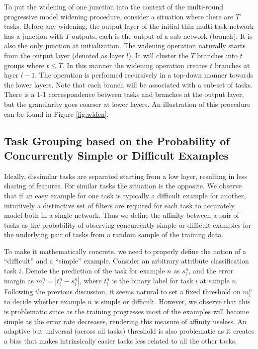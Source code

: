 \documentclass[10pt,twocolumn,letterpaper]{article}
\begin{document}
To put the widening of one junction into the context of the multi-round progressive model widening procedure, consider a situation where there are $T$ tasks. Before any widening, the output layer of the initial thin multi-task network has a junction with $T$ outputs, each is the output of a sub-network (branch). It is also the only junction at initialization. The widening operation naturally starts from the output layer (denoted as layer $l$). It will cluster the $T$ branches into $t$ groups where $t \leq T$. In this manner the widening operation creates $t$ branches at layer $l-1$. The operation is performed recursively in a top-down manner towards the lower layers. Note that each branch will be associated with a sub-set of tasks. There is a 1-1 correspondence between tasks and branches at the output layer, but the granularity goes coarser at lower layers. An illustration of this procedure can be found in Figure \ref{fig:widen}. 

\subsection{Task Grouping based on the Probability of Concurrently Simple or Difficult Examples}
\label{sec:aff}

Ideally, dissimilar tasks are separated starting from a low layer, resulting in less sharing of features. For similar tasks the situation is the opposite. We observe that if an easy example for one task is typically a difficult example for another, intuitively a distinctive set of filters are required for each task to accurately model both in a single network. Thus we define the affinity between a pair of tasks as the probability of observing concurrently simple or difficult examples for the underlying pair of tasks from a random sample of the training data. 

To make it mathematically concrete, we need to properly define the notion of a ``difficult'' and a ``simple'' example. Consider an arbitrary attribute classification task $i$. Denote the prediction of the task for example $n$ as $s_i^n$, and the error margin as $m_i^n = |t_i^n - s_i^n|$, where $t_i^n$ is the binary label for task $i$ at sample $n$. Following the previous discussion, it seems natural to set a fixed threshold on $m_i^n$ to decide whether example $n$ is simple or difficult. However, we observe that this is problematic since as the training progresses most of the examples will become simple as the error rate decreases, rendering this measure of affinity useless. An adaptive but universal (across all tasks) threshold is also problematic as it creates a bias that makes intrinsically easier tasks less related to all the other tasks. 
\end{document}
